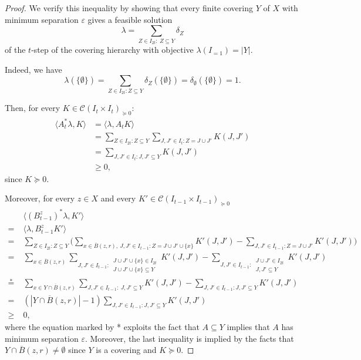 \documentclass[10pt,a4paper]{amsart}
\begin{document}
\begin{proof}
  We verify this inequality by showing that every finite covering $Y$
  of $X$ with minimum separation $\varepsilon$ gives a feasible solution
\[
\lambda = \sum_{Z\in I_{2t}:\ Z\subseteq Y}\delta_Z
\]
of the $t$-step of the covering hierarchy with objective
$\lambda(I_{=1}) = |Y|$.

Indeed, we have
\[
  \lambda\left(\{\emptyset\}\right) =\sum_{Z\in I_{2t}: Z\subseteq
    Y}\delta_Z
  \left(\{\emptyset\}\right)=\delta_{\emptyset}\left(\{\emptyset\}\right)=1.
\]

Then, for every $K \in \mathcal{C}(I_t\times I_t)_{\succeq 0}$:
\[
\begin{split}
		\langle A_t^* \lambda ,K \rangle & = \langle \lambda,A_t K\rangle\\
		& = \sum_{Z\in I_{2t} :Z\subseteq Y} \sum_{J,J'\in I_t
                  : Z = J\cup J'} K(J,J')\\
		& = \sum_{J,J'\in I_t : J,J'\subseteq Y} K(J,J')\\
                & \geq 0,
\end{split}
\]
since $K\succeq 0$.

Moreover, for every $z \in X$ and every $K' \in \mathcal{C}(I_{t-1}\times I_{t-1})_{\succeq 0}$
\[
\begin{split}
  & \langle (B_{t-1}^z)^* \lambda, K' \rangle\\
  = \; & \langle
                \lambda, B_{t-1}^z K'\rangle \\
		= \; & \sum_{Z\in I_{2t} :  Z\subseteq Y} \Big(\sum_{x \in
                  \overline{B}(z,r),\ J,J'\in I_{t-1} :  Z = J \cup J'
                  \cup \{x\} } K'(J,J')  -\sum_{J,J'\in I_{t-1} : Z = J \cup J'} K'(J,J')\Big)\\
          =\; & \sum_{x\in \overline{B}(z,r)} \sum_{J,J'\in I_{t-1}
          	:\ \substack{J\cup J' \cup \{x\}\in I_{2t}\\ J\cup J'\cup \{x\} \subseteq Y}} K'(J,J') -\sum_{J,J'\in I_{t-1}:\ \substack{J\cup J' \in I_{2t}\\ J,J'\subseteq Y}} K'(J,J')\\
          \overset{*}{=} \; & \sum_{x\in Y \cap \overline{B}(z,r)} \sum_{J,J'\in I_{t-1}
          	:\ J,J'\subseteq Y} K'(J,J') -\sum_{J,J'\in I_{t-1} :
          	J,J'\subseteq Y} K'(J,J')\\
                 = \; & (|Y \cap \overline{B}(z,r)| - 1) \sum_{J,J'\in I_{t-1}:
                  J,J'\subseteq Y} K'(J,J')\\
          \geq \; & 0,
\end{split}
\]
where the equation marked by * exploits the fact that $A\subseteq Y$ implies that $A$ has minimum separation $\varepsilon$. Moreover, the last inequality is implied by the facts that
$Y \cap \overline{B}(z,r) \neq \emptyset$ since $Y$ is a covering and $K\succeq 0$.
\end{proof}
\end{document}
